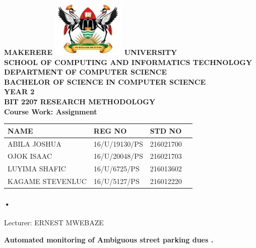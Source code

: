 \documentclass[12pt]{article}
\begin{document}
\begin{Huge}
\begin{center}
\begin{normalsize}
\textbf{MAKERERE \includegraphics[scale=0.5]{logo} UNIVERSITY }\\

\textbf{SCHOOL OF COMPUTING AND INFORMATICS TECHNOLOGY} \\
\textbf{DEPARTMENT OF COMPUTER SCIENCE} \\
\textbf{BACHELOR OF SCIENCE IN COMPUTER SCIENCE} \\
\textbf{YEAR 2} \\
\textbf{BIT 2207 RESEARCH METHODOLOGY} \\
\textbf{Course Work: Assignment }
\end{normalsize}
\end{center}
\end{Huge}

\begin{center}
\begin{tabular}{|l|l|l|c|}
\hline NAME  & REG NO & STD NO \\\hline
ABILA JOSHUA& 16/U/19130/PS & 216021700 \\\hline
OJOK ISAAC& 16/U/20048/PS& 216021703 \\\hline
LUYIMA SHAFIC& 16/U/6725/PS	 & 216013602 \\\hline
KAGAME STEVENLUC&16/U/5127/PS  & 216012220\\\hline

\end{tabular}

\paragraph{•}
Lecturer: ERNEST MWEBAZE \\


\end{center}

\newpage

\begin{center}
\textbf{\sc Automated monitoring of Ambiguous  street parking dues .}\\
\end{center}
\end{document}
